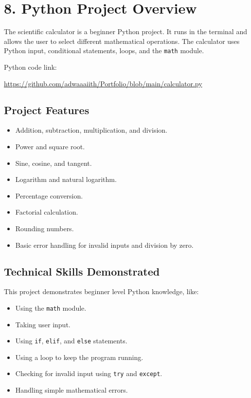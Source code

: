 \documentclass[12pt,a4paper]{article}
\begin{document}
\section{8. Python Project Overview}

The scientific calculator is a beginner Python project. It runs in the terminal and allows the user to select different mathematical operations. The calculator uses Python input, conditional statements, loops, and the \texttt{math} module.

Python code link:

\href{https://github.com/adwaaaiith/Portfolio/blob/main/calculator.py}{https://github.com/adwaaaiith/Portfolio/blob/main/calculator.py}

\subsection{Project Features}

\begin{itemize}[leftmargin=*]
    \item Addition, subtraction, multiplication, and division.
    \item Power and square root.
    \item Sine, cosine, and tangent.
    \item Logarithm and natural logarithm.
    \item Percentage conversion.
    \item Factorial calculation.
    \item Rounding numbers.
    \item Basic error handling for invalid inputs and division by zero.
\end{itemize}

\subsection{Technical Skills Demonstrated}

This project demonstrates beginner level Python knowledge, like:

\begin{itemize}[leftmargin=*]
    \item Using the \texttt{math} module.
    \item Taking user input.
    \item Using \texttt{if}, \texttt{elif}, and \texttt{else} statements.
    \item Using a loop to keep the program running.
    \item Checking for invalid input using \texttt{try} and \texttt{except}.
    \item Handling simple mathematical errors.
\end{itemize}
\end{document}
